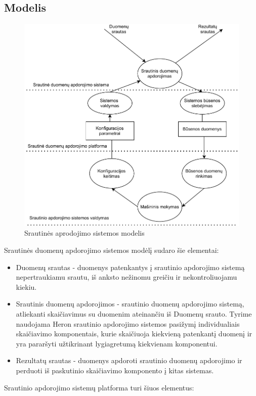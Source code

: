 \documentclass{VUMIFPSbakalaurinis}
\begin{document}
\subsection{Modelis}
\begin{figure}[H]
    \includegraphics[width=15cm]{img/DataFlow.pdf}
    \caption{Srautinės aprodojimo sistemos modelis}
    \label{dataflow}
\end{figure} 
Srautinės duomenų apdorojimo sistemos modėlį sudaro šie elementai:
\begin{itemize}
    \item Duomenų srautas - duomenys patenkantys į srautinio apdorojimo sistemą nepertraukiamu srautu, iš anksto nežinomu greičiu ir nekontroliuojamu kiekiu.
    \item Srautinis duomenų apdorojimos - srautinio duomenų apdorojimo sistemą, atliekanti skaičiavimus su duomenim ateinančiu iš Duomenų srauto. Tyrime naudojama Heron srautinio apdorojimo sistemos pasižymį individualiais skaičiavimo komponentais, kurie skaičiuoja kiekvieną patenkantį duomenį ir yra pararšyti užtikrinant lygiagretumą kiekvienam komponentui.
    \item Rezultatų srautas - duomenys apdoroti srautinio duomenų apdorojimo ir perduoti iš paskutinio skaičiavimo komponento į kitas sistemas.
\end{itemize}
Srautinio apdorojimo sistemų platforma turi šiuos elementus:
\end{document}
